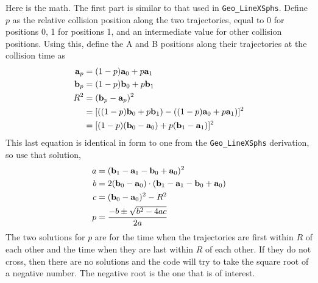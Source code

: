 \documentclass[11pt]{article}
\newcommand {\ttt} {\texttt}
\begin{document}
\begin{description}
Here is the math. The first part is similar to that used in \ttt{Geo\_LineXSphs}. Define $p$ as the relative collision position along the two trajectories, equal to 0 for positions 0, 1 for positions 1, and an intermediate value for other collision positions. Using this, define the A and B positions along their trajectories at the collision time as
\begin{align*}
\vb{a}_p &= (1-p)\vb{a}_0 + p\vb{a}_1 \\
\vb{b}_p &= (1-p)\vb{b}_0 + p\vb{b}_1 \\
R^2 &= (\vb{b}_p - \vb{a}_p)^2 \\
&= [((1-p)\vb{b}_0 + p \vb{b}_1) - ((1-p)\vb{a}_0 + p\vb{a}_1)]^2 \\
&= [(1-p)(\vb{b}_0 - \vb{a}_0) + p (\vb{b}_1 - \vb{a}_1)]^2
\end{align*}
This last equation is identical in form to one from the \ttt{Geo\_LineXSphs} derivation, so use that solution,
\begin{align*}
a &= (\vb{b}_1 - \vb{a}_1 - \vb{b}_0 + \vb{a}_0)^2 \\
b &= 2(\vb{b}_0 - \vb{a}_0) \cdot (\vb{b}_1 - \vb{a}_1 - \vb{b}_0 + \vb{a}_0) \\
c &= (\vb{b}_0 - \vb{a}_0)^2 - R^2 \\
p &= \frac{-b \pm \sqrt{b^2 - 4ac}}{2a}
\end{align*}
The two solutions for $p$ are for the time when the trajectories are first within $R$ of each other and the time when they are last within $R$ of each other. If they do not cross, then there are no solutions and the code will try to take the square root of a negative number. The negative root is the one that is of interest.


\end{description}
\end{document}
